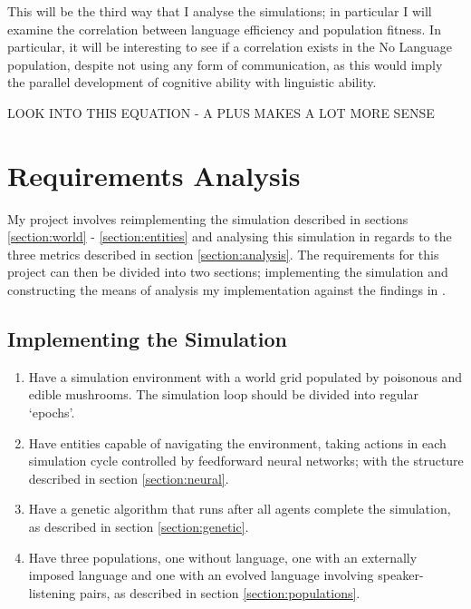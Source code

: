 \documentclass[12pt,a4paper,twoside,openright]{report}
\begin{document}
This will be the third way that I analyse the simulations; in particular I will examine the correlation between language efficiency and population fitness. In particular, it will be interesting to see if a correlation exists in the No Language population, despite not using any form of communication, as this would imply the parallel development of cognitive ability with linguistic ability.

LOOK INTO THIS EQUATION - A PLUS MAKES A LOT MORE SENSE

\section{Requirements Analysis}\label{section:requirements}

My project involves reimplementing the simulation described in sections \ref{section:world} - \ref{section:entities} and analysing this simulation in regards to the three metrics described in section \ref{section:analysis}. The requirements for this project can then be divided into two sections; implementing the simulation and constructing the means of analysis my implementation against the findings in \citet{Cangelosi1998}.

\subsection*{Implementing the Simulation}

\begin{enumerate}

\item Have a simulation environment with a world grid populated by poisonous and edible mushrooms. The simulation loop should be divided into regular `epochs'.

\item Have entities capable of navigating the environment, taking actions in each simulation cycle controlled by feedforward neural networks; with the structure described in section \ref{section:neural}.

\item Have a genetic algorithm that runs after all agents complete the simulation, as described in section \ref{section:genetic}.

\item Have three populations, one without language, one with an externally imposed language and one with an evolved language involving speaker-listening pairs, as described in section \ref{section:populations}.

\end{enumerate}
\end{document}
